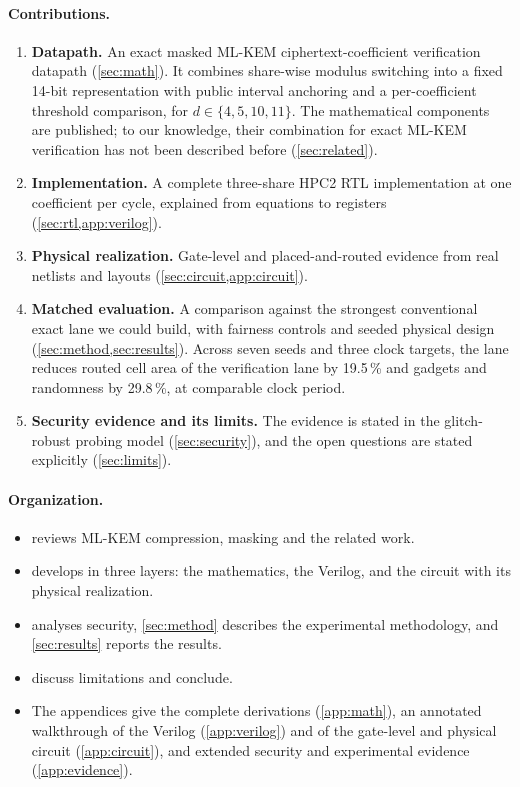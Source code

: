 \paragraph{Contributions.}
\begin{enumerate}
  \item \textbf{Datapath.} An exact masked ML-KEM ciphertext-coefficient verification datapath (\cref{sec:math}). It combines share-wise modulus switching into a fixed 14-bit representation with public interval anchoring and a per-coefficient threshold comparison, for $d \in \{4,5,10,11\}$. The mathematical components are published; to our knowledge, their combination for exact ML-KEM verification has not been described before (\cref{sec:related}).
  \item \textbf{Implementation.} A complete three-share HPC2 RTL implementation at one coefficient per cycle, explained from equations to registers (\cref{sec:rtl,app:verilog}).
  \item \textbf{Physical realization.} Gate-level and placed-and-routed evidence from real netlists and layouts (\cref{sec:circuit,app:circuit}).
  \item \textbf{Matched evaluation.} A comparison against the strongest conventional exact lane we could build, with fairness controls and seeded physical design (\cref{sec:method,sec:results}). Across seven seeds and three clock targets, the \PAMS{} lane reduces routed cell area of the verification lane by \num{19.5}\,\% and gadgets and randomness by \num{29.8}\,\%, at comparable clock period.
  \item \textbf{Security evidence and its limits.} The evidence is stated in the glitch-robust probing model (\cref{sec:security}), and the open questions are stated explicitly (\cref{sec:limits}).
\end{enumerate}

\paragraph{Organization.}
\begin{itemize}
  \item {} reviews ML-KEM compression, masking and the related work.
  \item {} develops \PAMS{} in three layers: the mathematics, the Verilog, and the circuit with its physical realization.
  \item {} analyses security, \cref{sec:method} describes the experimental methodology, and \cref{sec:results} reports the results.
  \item {} discuss limitations and conclude.
  \item The appendices give the complete derivations (\cref{app:math}), an annotated walkthrough of the Verilog (\cref{app:verilog}) and of the gate-level and physical circuit (\cref{app:circuit}), and extended security and experimental evidence (\cref{app:evidence}).
\end{itemize}
